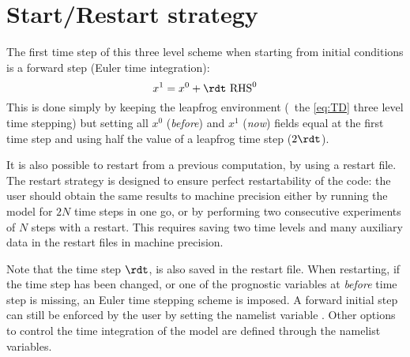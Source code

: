 \documentclass[../main/NEMO_manual]{subfiles}
\begin{document}
\section{Start/Restart strategy}
\label{sec:TD_rst}

\begin{listing}
  \caption{}
  \label{lst:namrun}
\end{listing}

The first time step of this three level scheme when starting from initial conditions is
a forward step (Euler time integration):
\[
  x^1 = x^0 + \rdt \ \text{RHS}^0
\]
This is done simply by keeping the leapfrog environment
(\ie\ the \autoref{eq:TD} three level time stepping) but
setting all $x^0$ (\textit{before}) and $x^1$ (\textit{now}) fields equal at the first time step and
using half the value of a leapfrog time step ($2 \rdt$).

It is also possible to restart from a previous computation, by using a restart file.
The restart strategy is designed to ensure perfect restartability of the code:
the user should obtain the same results to machine precision either by
running the model for $2N$ time steps in one go,
or by performing two consecutive experiments of $N$ steps with a restart.
This requires saving two time levels and many auxiliary data in
the restart files in machine precision.

Note that the time step $\rdt$, is also saved in the restart file.
When restarting, if the time step has been changed, or
one of the prognostic variables at \textit{before} time step is missing,
an Euler time stepping scheme is imposed.
A forward initial step can still be enforced by the user by
setting the namelist variable .
Other options to control the time integration of the model are defined through
the  namelist variables.


\end{document}
